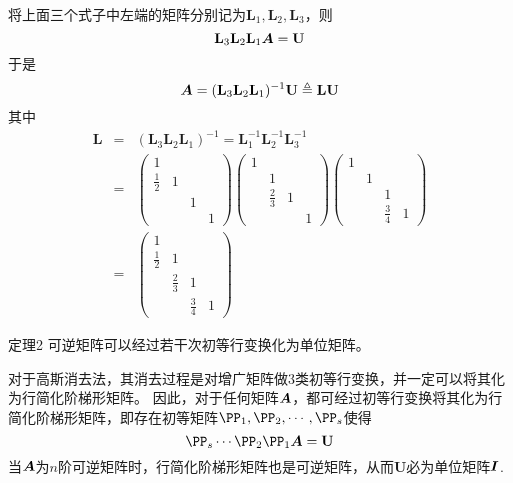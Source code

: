 \begin{frame}
  \begin{footnotesize}
    将上面三个式子中左端的矩阵分别记为$\mathbf{L}_1,\mathbf{L}_2,\mathbf{L}_3$，则
    $$
    \mathbf{L}_3\mathbf{L}_2\mathbf{L}_1 \boldsymbol{A} = \mathbf{U}
    $$
    \pause 
    于是
    $$
    \boldsymbol{A} = (\mathbf{L}_3\mathbf{L}_2\mathbf{L}_1)^{-1}\mathbf{U} \triangleq \mathbf{L}\mathbf{U} 
    $$
    \pause 
    其中
    $$
    \begin{array}{rcl}
      \mathbf{L} &=& (\mathbf{L}_3\mathbf{L}_2\mathbf{L}_1)^{-1} 
      =  \mathbf{L}_1^{-1}\mathbf{L}_2^{-1}\mathbf{L}_3^{-1}\\[0.2cm]
      &=&  
\left(
    \begin{array}{cccc}
      1 & && \\
      \frac12 &1&&\\
      &&1&\\
      &&&1
    \end{array}
    \right)
 \left(
    \begin{array}{cccc}
      1 & && \\
      &1&&\\
      &\frac23&1&\\
      &&&1
    \end{array}
    \right)
      \left(
    \begin{array}{cccc}
      1 & && \\
      &1&&\\
      &&1&\\
      &&\frac34&1
    \end{array}
    \right) \\[0.6cm]
      &=&   \left(
    \begin{array}{cccc}
      1 & && \\
      \frac12 &1&&\\
      &\frac23&1&\\
      &&\frac34&1
    \end{array}
    \right)
    \end{array}    
    $$
  \end{footnotesize}
\end{frame}

\begin{frame}
  \begin{footnotesize}
    \begin{block}{定理2}
      可逆矩阵可以经过若干次初等行变换化为单位矩阵。
    \end{block}
    \pause
    \proofname
    对于高斯消去法，其消去过程是对增广矩阵做$3$类初等行变换，并一定可以将其化为行简化阶梯形矩阵。\pause 
    因此，对于任何矩阵$\boldsymbol{A}$，都可经过初等行变换将其化为行简化阶梯形矩阵，即存在初等矩阵$\PP_1,\PP_2,\cd,\PP_s$使得
    $$
    \PP_s \cd \PP_2 \PP_1 \A = \mathbf{U}
    $$
    \pause
    当$\boldsymbol{A}$为$n$阶可逆矩阵时，行简化阶梯形矩阵也是可逆矩阵，从而$\mathbf{U}$必为单位矩阵$\boldsymbol{I}$.
  \end{footnotesize}
\end{frame}


